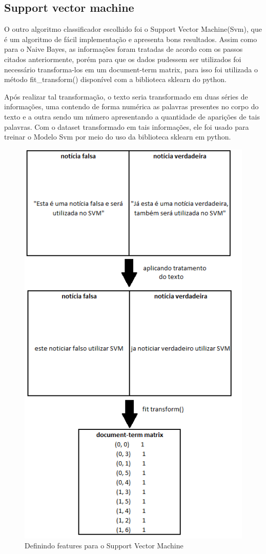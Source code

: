 \documentclass[conference]{IEEEtran}
\begin{document}
\subsection{Support vector machine}

O outro algoritmo classificador escolhido foi o Support Vector Machine(Svm), que é um algoritmo de fácil implementação e apresenta bons resultados. Assim como para o Naive Bayes, as informações foram tratadas de acordo com os passos citados anteriormente, porém para que os dados pudessem ser utilizados foi necessário transforma-los em um document-term matrix, para isso foi utilizada o método fit\_transform() disponível com a biblioteca sklearn do python. 

Após realizar tal transformação, o texto seria transformado em duas séries de informações, uma contendo de forma numérica as palavras presentes no corpo do texto e a outra sendo um número apresentando a quantidade de aparições de tais palavras. Com o dataset transformado em tais informações, ele foi usado para treinar o Modelo Svm por meio do uso da biblioteca sklearn em python.

\begin{figure}[htbp]
\centerline{\includegraphics[scale=0.6]{svm.png}}
\caption{Definindo features para o Support Vector Machine}
\label{fig}
\end{figure}
\end{document}
